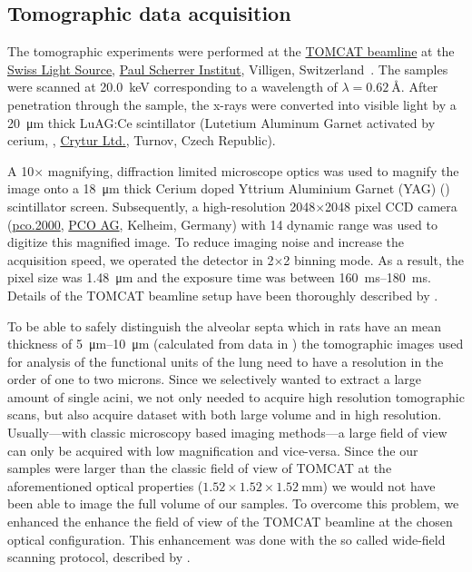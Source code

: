 \documentclass[%
	paper=a4,%
	abstract=true,%
	]{scrartcl}
\begin{document}
\subsection{Tomographic data acquisition\label{sec:tomcat}}
The tomographic experiments were performed at the \href{http://www.psi.ch/sls/tomcat/}{TOMCAT beamline} at the \href{http://www.psi.ch/sls/}{Swiss Light Source}, \href{http://www.psi.ch/}{Paul Scherrer Institut}, Villigen, Switzerland~\cite{Stampanoni2006a}. The samples were scanned at \SI{20.0}{\kilo\electronvolt} corresponding to a wavelength of \(\lambda=\SI{0.62}{\angstrom}\). %
After penetration through the sample, the x-rays were converted into visible light by a \SI{20}{\micro\meter} thick LuAG:Ce scintillator (Lutetium Aluminum Garnet activated by cerium, , \href{http://www.crytur.cz/}{Crytur Ltd.}, Turnov, Czech Republic).

A 10\(\times\) magnifying, diffraction limited microscope optics was used to magnify the image onto a \SI{18}{\micro\meter} thick Cerium doped Yttrium Aluminium Garnet (YAG) () scintillator screen. Subsequently, a high-resolution 2048\(\times\)2048 pixel CCD camera (\href{http://www.pco.de/sensitive-cameras/pco2000/}{pco.2000}, \href{http://www.pco.de/}{PCO AG}, Kelheim, Germany) with \SI{14}{\bit} dynamic range was used to digitize this magnified image. To reduce imaging noise and increase the acquisition speed, we operated the detector in 2\(\times\)2 binning mode. As a result, the pixel size was \SI{1.48}{\micro\meter} and the exposure time was between \SIrange{160}{180}{\milli\second}. Details of the TOMCAT beamline setup have been thoroughly described by \citet{Stampanoni2006a}.

To be able to safely distinguish the alveolar septa which in rats have an mean thickness of \SIrange{5}{10}{\micro\meter} (calculated from data in \citet{Burri1974}) the tomographic images used for analysis of the functional units of the lung need to have a resolution in the order of one to two microns. Since we selectively wanted to extract a large amount of single acini, we not only needed to acquire high resolution tomographic scans, but also acquire dataset with both large volume and in high resolution. Usually---with classic microscopy based imaging methods---a large field of view can only be acquired with low magnification and vice-versa. Since the our samples were larger than the classic field of view of TOMCAT at the aforementioned optical properties (\(1.52\times1.52\times\SI{1.52}{\milli\meter}\)) we would not have been able to image the full volume of our samples. To overcome this problem, we enhanced the enhance the field of view of the TOMCAT beamline at the chosen optical configuration. This enhancement was done with the so called wide-field scanning protocol, described by \citet{Haberthuer2010}.
\end{document}
